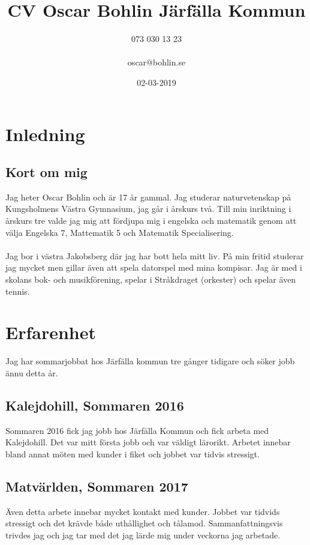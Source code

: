 \documentclass{article}
\title{CV Oscar Bohlin Järfälla Kommun}
\author{073 030 13 23 \\\\ oscar@bohlin.se}
\date{02-03-2019}
\begin{document}
\maketitle
\newpage
\tableofcontents
\newpage
{}
\newpage

\section{Inledning}

\subsection{Kort om mig}

    Jag heter Oscar Bohlin och är 17 år gammal. Jag studerar naturvetenskap på Kungsholmens Västra Gymnasium, jag går i årskurs två. Till min inriktning i årskurs tre valde jag mig att fördjupa mig i engelska och matematik genom att välja Engelska 7, Mattematik 5 och Matematik Specialisering. \\\\ Jag bor i västra Jakobsberg där jag har bott hela mitt liv. På min fritid studerar jag mycket men gillar även att spela datorspel med mina kompisar. Jag är med i skolans bok- och musikförening, spelar i Stråkdraget (orkester) och spelar även tennis. 


\section{Erfarenhet}

    Jag har sommarjobbat hos Järfälla kommun tre gånger tidigare och söker jobb ännu detta år.

\subsection{Kalejdohill, Sommaren 2016}

    Sommaren 2016 fick jag jobb hos Järfälla Kommun och fick arbeta med Kalejdohill. Det var mitt första jobb och var väldigt lärorikt. Arbetet innebar bland annat möten med kunder i fiket och jobbet var tidvis stressigt. 

\subsection{Matvärlden, Sommaren 2017}

    Även detta arbete innebar mycket kontakt med kunder. Jobbet var tidvids stressigt och det krävde både uthållighet och tålamod. Sammanfattningsvis trivdes jag och jag tar med det jag lärde mig under veckorna jag arbetade.   
\end{document}
